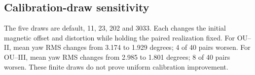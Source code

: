 \subsection{Calibration-draw sensitivity}
The five draws are default, 11, 23, 202 and 3033. Each changes the initial
magnetic offset and distortion while holding the paired realization fixed.
For OU--II, mean yaw RMS changes from 3.174 to 1.929 degrees; 4 of 40 pairs worsen.
For OU--III, mean yaw RMS changes from 2.985 to 1.801 degrees; 8 of 40 pairs worsen.
These finite draws do not prove uniform calibration improvement.

